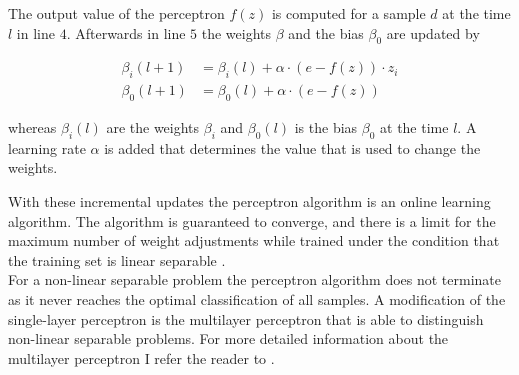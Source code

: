 The output value of the perceptron $f(z)$ is computed for a sample $d$ at the time $l$ in line $4$.
Afterwards in line $5$ the weights $\beta$ and the bias $\beta_0$ are updated by

\begin{align*}
\beta_i(l+1) &= \beta_i(l) + \alpha \cdot (e - f(z)) \cdot z_i\\
\beta_0(l+1) &= \beta_0(l) + \alpha \cdot (e - f(z))
\end{align*}

whereas $\beta_i(l)$ are the weights $\beta_i$ and $\beta_0(l)$ is the bias $\beta_0$ at the time $l$.
A learning rate $\alpha$ is added that determines the value that is used to change the weights.

With these incremental updates the perceptron algorithm is an online learning algorithm.
The algorithm is guaranteed to converge, and there is a limit for the maximum number of weight adjustments while trained under the condition that the training set is linear separable \cite{2016Perceptron}.\\
For a non-linear separable problem the perceptron algorithm does not terminate as it never reaches the optimal classification of all samples. %
A modification of the single-layer perceptron is the multilayer perceptron that is able to distinguish non-linear separable problems.
For more detailed information about the multilayer perceptron I refer the reader to \cite{2017MultilayerPerceptron}.











